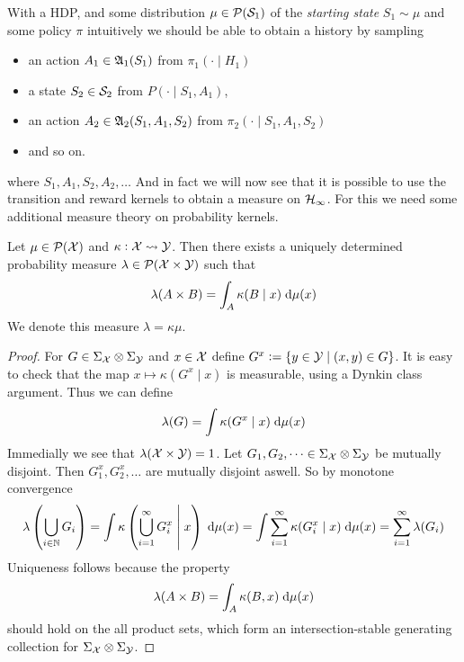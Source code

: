 With a HDP, and some distribution $\mu \in \mathcal{P}(\mathcal{S}_1)$
of the \emph{starting state} $S_1 \sim \mu$
and some policy $\pi$ intuitively we
should be able to obtain a history by sampling
\begin{itemize}
  \item an action $A_1 \in \frak{A}_1(S_1)$ from $\pi_1(\cdot \mid H_1)$
  \item a state $S_2 \in \mathcal{S}_2$ from $P(\cdot \mid S_1, A_1)$,
  \item an action $A_2 \in \frak{A}_2(S_1, A_1, S_2)$ from $\pi_2(\cdot \mid
    S_1, A_1, S_2)$
  \item and so on.
\end{itemize}

where $S_1, A_1, S_2, A_2, \dots$ 
And in fact we will now see that it is possible to use the transition
and reward kernels to obtain a measure on $\mathcal{H}_\infty$.
For this we need some additional measure theory on
probability kernels.

\begin{thm}
  Let $\mu \in \mathcal{P}(\mathcal{X})$ and $\kappa : \mathcal{X} \leadsto \mathcal{Y}$.
  Then there exists a uniquely determined probability measure
  $\lambda \in \mathcal{P}(\mathcal{X} \times \mathcal{Y})$
  such that
  \[ \lambda(A \times B) = \int_A \kappa(B \mid x) \; \mathrm{d} \mu(x) \]
  \label{thm:intKer}
  We denote this measure $\lambda = \kappa \mu$.
\end{thm}
\begin{proof}
  For $G \in \Sigma_\mathcal{X} \otimes \Sigma_\mathcal{Y}$ and $x \in \mathcal{X}$ define
  $G^x \vcentcolon= \{ y \in \mathcal{Y} \mid (x, y) \in G \} $.
  It is easy to check that the map $x \mapsto \kappa(G^x \mid x)$ is
  measurable, using a Dynkin class argument.
  Thus we can define
  \[ \lambda(G) = \int \kappa(G^x \mid x) \; \mathrm{d} \mu(x) \]
  Immedially we see that
  $\lambda(\mathcal{X} \times \mathcal{Y}) = 1$.
  Let $G_1, G_2, \dots \in \Sigma_\mathcal{X} \otimes \Sigma_\mathcal{Y}$ be
  mutually disjoint.
  Then $G_1^x, G_2^x, \dots$ are mutually disjoint aswell.
  So by monotone convergence
  \[ \lambda \left( \bigcup_{i \in \mathbb{N}} G_i \right)
  = \int \kappa\left( \bigcup_{i=1}^\infty G_i^x \;\middle\vert\; x \right) \; \mathrm{d} \mu(x)
    = \int \sum_{i=1}^\infty \kappa(G^x_i \mid x) \; \mathrm{d} \mu(x)
  = \sum_{i=1}^\infty \lambda (G_i) \]
  Uniqueness follows because the property
  \[ \lambda(A \times B) = \int_A \kappa(B, x) \; \mathrm{d} \mu(x) \]
  should hold on the all product sets, which form an
  intersection-stable generating collection for
  $\Sigma_\mathcal{X} \otimes \Sigma_\mathcal{Y}$.
\end{proof}

